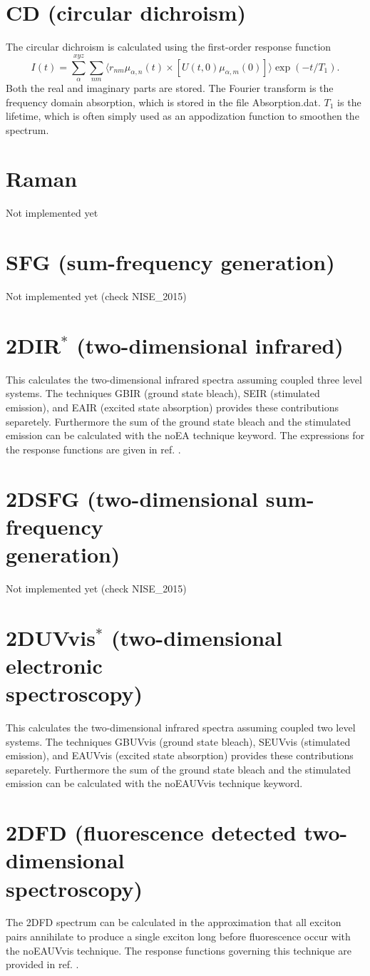 \section{CD (circular dichroism)}
The circular dichroism is calculated using the first-order response function
\begin{equation}
	I(t)=\sum_{\alpha}^{xyz}\sum_{nm}\langle r_{nm}\mu_{\alpha,n}(t)\times[U(t,0)\mu_{\alpha,m}(0)]\rangle\exp(-t/T_1).
\end{equation}
Both the real and imaginary parts are stored. The Fourier transform is the frequency domain absorption, which is stored in the file Absorption.dat. $T_1$ is the lifetime, which is often simply used as an appodization function to smoothen the spectrum.
\section{Raman}
Not implemented yet
\section{SFG (sum-frequency generation)}
Not implemented yet (check NISE\_2015)
\section{2DIR$^{*}$ (two-dimensional infrared)}
This calculates the two-dimensional infrared spectra assuming coupled three level systems. The techniques GBIR (ground state bleach), SEIR (stimulated emission), and EAIR (excited state absorption) provides these contributions separetely. Furthermore the sum of the ground state bleach and the stimulated emission can be calculated with the noEA technique keyword. The expressions for the response functions are given in ref. \cite{Jansen.2006.JPCB.110.22910}.
\section{2DSFG (two-dimensional sum-frequency\\ generation)}
 Not implemented yet (check NISE\_2015)
\section{2DUVvis$^{*}$ (two-dimensional electronic\\ spectroscopy)}
This calculates the two-dimensional infrared spectra assuming coupled two level systems. The techniques GBUVvis (ground state bleach), SEUVvis (stimulated emission), and EAUVvis (excited state absorption) provides these contributions separetely. Furthermore the sum of the ground state bleach and the stimulated emission can be calculated with the noEAUVvis technique keyword. 
\section{2DFD (fluorescence detected two-dimensional\\ spectroscopy)}
 The 2DFD spectrum can be calculated in the approximation that all exciton pairs annihilate to produce a single exciton long before fluorescence occur with the noEAUVvis technique. The response functions governing this technique are provided in ref. \cite{Kunsel_2018}.
